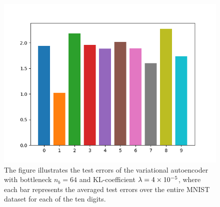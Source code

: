 \begin{figure}
\begin{center}
      \includegraphics[width=0.49\linewidth]{convolutional_VAE_snd_KL_4e-5_10k_epochs_64D_errors}
\end{center}
\caption{The figure illustrates the test errors of the variational autoencoder with bottleneck $n_b=64$ and KL-coefficient $\lambda = \num{4e-5}$, where each bar represents the averaged test errors over the entire MNIST dataset for each of the ten digits.}\label{fig:convolutional_VAE_snd_KL_4e-5_10k_epochs_64D_errors}
\end{figure}


